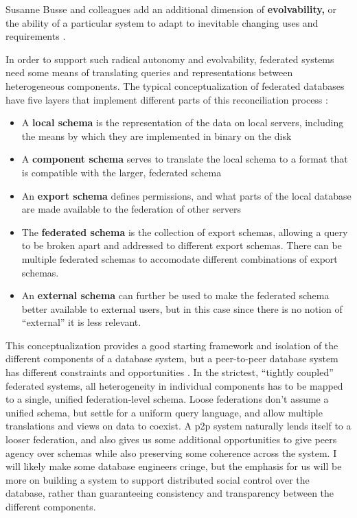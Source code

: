 Susanne Busse and colleagues add an additional dimension of
\textbf{evolvability,} or the ability of a particular system to adapt to
inevitable changing uses and requirements \citep{busseFederatedInformationSystems1999} .

In order to support such radical autonomy and evolvability, federated
systems need some means of translating queries and representations
between heterogeneous components. The typical conceptualization of
federated databases have five layers that implement different parts of
this reconciliation process \citep{shethFederatedDatabaseSystems1990} :

\begin{itemize}

\item
  A \textbf{local schema} is the representation of the data on local
  servers, including the means by which they are implemented in binary
  on the disk
\item
  A \textbf{component schema} serves to translate the local schema to a
  format that is compatible with the larger, federated schema
\item
  An \textbf{export schema} defines permissions, and what parts of the
  local database are made available to the federation of other servers
\item
  The \textbf{federated schema} is the collection of export schemas,
  allowing a query to be broken apart and addressed to different export
  schemas. There can be multiple federated schemas to accomodate
  different combinations of export schemas.
\item
  An \textbf{external schema} can further be used to make the federated
  schema better available to external users, but in this case since
  there is no notion of ``external'' it is less relevant.
\end{itemize}

This conceptualization provides a good starting framework and isolation
of the different components of a database system, but a peer-to-peer
database system has different constraints and opportunities \citep{bonifatiDistributedDatabasesPeertopeer2008} . In the strictest,
``tightly coupled'' federated systems, all heterogeneity in individual
components has to be mapped to a single, unified federation-level
schema. Loose federations don't assume a unified schema, but settle for
a uniform query language, and allow multiple translations and views on
data to coexist. A p2p system naturally lends itself to a looser
federation, and also gives us some additional opportunities to give
peers agency over schemas while also preserving some coherence across
the system. I will likely make some database engineers cringe, but the
emphasis for us will be more on building a system to support distributed
social control over the database, rather than guaranteeing consistency
and transparency between the different components.

